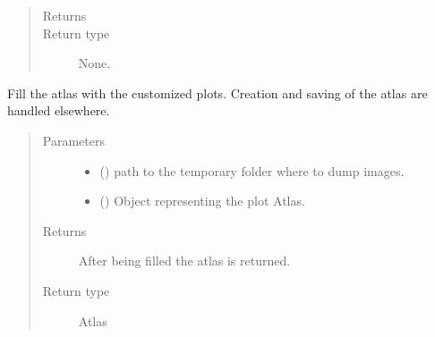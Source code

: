 \documentclass[letterpaper,10pt,english]{sphinxmanual}
\begin{document}
\begin{fulllineitems}
\begin{quote}
\begin{description}
\item[{Returns}] \leavevmode
\sphinxAtStartPar


\item[{Return type}] \leavevmode
\sphinxAtStartPar
None.

\end{description}\end{quote}

\begin{fulllineitems}
\label{\detokenize{api/postprocessing:expoutput.ExperimentalOutput._build_atlas}}
\sphinxAtStartPar
Fill the atlas with the customized plots. Creation and saving of the
atlas are handled elsewhere.
\begin{quote}\begin{description}
\item[{Parameters}] \leavevmode\begin{itemize}
\item {} 
\sphinxAtStartPar
{} () \textendash{} path to the temporary folder where to dump images.

\item {} 
\sphinxAtStartPar
{} () \textendash{} Object representing the plot Atlas.

\end{itemize}

\item[{Returns}] \leavevmode
\sphinxAtStartPar
{} \textendash{} After being filled the atlas is returned.

\item[{Return type}] \leavevmode
\sphinxAtStartPar
Atlas

\end{description}\end{quote}

\end{fulllineitems}



\end{fulllineitems}
\end{document}
